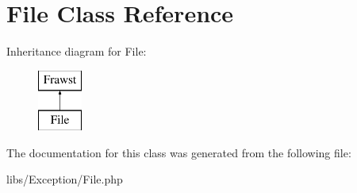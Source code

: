 \hypertarget{classFile}{
\section{File Class Reference}
\label{classFile}
}
Inheritance diagram for File:\begin{figure}[H]
\begin{center}
\leavevmode
\includegraphics[height=2.000000cm]{classFile}
\end{center}
\end{figure}


The documentation for this class was generated from the following file:\begin{DoxyCompactItemize}
\item 
libs/Exception/File.php\end{DoxyCompactItemize}
